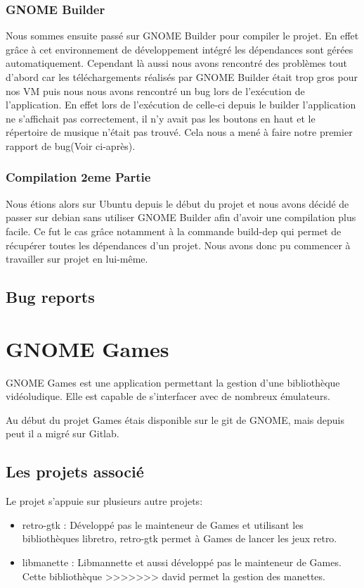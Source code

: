 \documentclass[12pt]{report}
\begin{document}
\subsection{GNOME Builder}
Nous sommes ensuite passé sur GNOME Builder pour compiler le projet.
En effet grâce à cet environnement de développement intégré les 
dépendances sont gérées automatiquement. Cependant là aussi nous
avons rencontré des problèmes tout d'abord car les téléchargements
réalisés par GNOME Builder était trop gros pour nos VM puis nous 
nous avons rencontré un bug lors de l’exécution de l'application.
En effet lors de l'exécution de celle-ci depuis le builder l'application
ne s'affichait pas correctement, il n'y avait pas les boutons en haut
et le répertoire de musique n’était pas trouvé. Cela nous a mené à 
faire notre premier rapport de bug(Voir ci-après).

\subsection{Compilation 2eme Partie}
Nous étions alors sur Ubuntu depuis le début du projet et nous avons
décidé de passer sur debian sans utiliser GNOME Builder afin d'avoir 
une compilation plus facile. Ce fut le cas grâce notamment à la 
commande build-dep qui permet de récupérer toutes les dépendances d'un 
projet. Nous avons donc pu commencer à travailler sur projet en 
lui-même.

\section{Bug reports}

\newpage
\chapter{GNOME Games}
GNOME Games est une application permettant la gestion d'une
bibliothèque vidéoludique. Elle est capable de s'interfacer avec de
nombreux émulateurs.

Au début du projet Games étais disponible sur le git de GNOME, mais 
depuis peut il a migré sur Gitlab.

\section{Les projets associé}
Le projet s'appuie sur plusieurs autre projets:
\begin{itemize}
\item retro-gtk : Développé pas le mainteneur de Games et utilisant les bibliothèques libretro,
retro-gtk permet à Games de lancer les jeux retro.
\item libmanette : Libmannette et aussi développé pas le mainteneur de Games. Cette bibliothèque
>>>>>>> david
permet la gestion des manettes.
\end{itemize}
\end{document}

